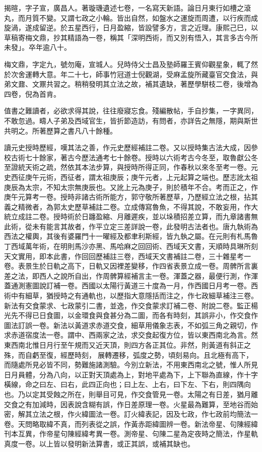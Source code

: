 \begin{pinyinscope}
揭暄，字子宣，廣昌人。著璇璣遺述七卷，一名寫天新語。論日月東行如槽之滾丸，而月質不變。又謂七政之小輪。皆出自然，如盤水之運旋而周遭，以行疾而成旋渦，遂成留逆。於五星西行，日月盈縮，皆設譬多方，言之近理。康熙己巳，以草稿寄梅文鼎，抄其精語為一卷，稱其「深明西術，而又別有悟入，其言多古今所未發」。卒年逾八十。

梅文鼎，字定九，號勿庵，宣城人。兒時侍父士昌及塾師羅王賓仰觀星象，輒了然於次舍運轉大意。年二十七，師事竹冠道士倪觀湖，受麻孟旋所藏臺官交食法，與弟文鼐、文鼏共習之。稍稍發明其立法之故，補其遺缺，著歷學駢枝二卷，後增為四卷，倪為首肯。

值書之難讀者，必欲求得其說，往往廢寢忘食。殘編散帖，手自抄集，一字異同，不敢忽過。疇人子弟及西域官生，皆折節造訪，有問者，亦詳告之無隱，期與斯世共明之。所著歷算之書凡八十餘種。

讀元史授時歷經，嘆其法之善，作元史歷經補註二卷。又以授時集古法大成，因參校古術七十餘家，著古今歷法通考七十餘卷。授時以六術考古今冬至，取魯獻公冬至證統天術之疏，然依其本法步算，與授時所得正同，作春秋以來冬至考一卷。元史西征庚午元術，西征者，謂太祖庚辰；庚午元者，上元起算之端也。歷志訛太祖庚辰為太宗，不知太宗無庚辰也。又訛上元為庚子，則於積年不合。考而正之，作庚午元算考一卷。授時非諸古術所能方，郭守敬所著歷草，乃歷經立法之根，拈其義之精微者，為郭太史歷草補註二卷。立成傳寫魯魚，不得其說，不敢妄用，作大統立成註二卷。授時術於日躔盈縮、月離遲疾，並以垛積招差立算，而九章諸書無此術，從未有能言其故者，作平立定三差詳說一卷，此發明古法者也。唐九執術為西法之權輿，其後有婆羅門十一曜經及都聿利斯經，皆九執之屬。在元則有札馬魯丁西域萬年術，在明則馬沙亦黑、馬哈麻之回回術、西域天文書，天順時具琳所刻天文實用，即本此書，作回回歷補註三卷，西域天文書補註二卷，三十雜星考一卷。表景生於日軌之高下，日軌又因裡差變移，作四省表景立成一卷。周髀所言裏差之法，即西人之說所自出，作周髀算經補言主一卷。渾蓋之器，最便行測，作渾蓋通測憲圖說訂補一卷。西國以太陽行黃道三十度為一月，作西國日月考一卷。西術中有細草，猶授時之有通軌也，以歷指大意隱括而注之，作七政細草補注三卷。新法有交食蒙求、七政蒙引二書，並逸，作交食蒙求訂補二卷、附說二卷。監正楊光先不得已日食圖，以金環食與食甚分為二圖，而各有時刻，其誤非小，作交食作圖法訂誤一卷。新法以黃道求赤道交食，細草用儀象志表，不如弧三角之親切，作求赤道宿度法一卷。謂中、西兩家之法，求交食起復方位，皆以東西南北為言。然東西南北惟日月行至午規而又近天頂，則四方各正其位。非然，則黃道有斜正之殊，而自虧至復，經歷時刻，展轉遷移，弧度之勢，頃刻易向。且北極有高下，而隨處所見必皆不同，勢難施諸測驗。今別立新法，不用東西南北之號，惟人所見日月員體，分為八向，以正對天頂處為上，對地平處為下，上下聯為直線，作十字橫線，命之曰左、曰右，此四正向也；曰上左、上右，曰下左、下右，則四隅向也。乃以定其受蝕之所在，則舉目可見，作交食管見一卷。太陽之有日差，猶月離交食之有加減時，因表說含糊有誤，作日差原理一卷。火星最為難算，至地谷而始密，解其立法之根，作火緯圖法一卷。訂火緯表記，因及七政，作七政前均簡法一卷。天問略取緯不真，而列表從之誤，作黃赤距緯圖辨一卷。新法帝星、句陳經緯刊本互異，作帝星句陳經緯考異一卷。測帝星、句陳二星為定夜時之簡法，作星軌真度一卷。以上皆以發明新法算書，或正其誤，或補其缺也。


\end{pinyinscope}
